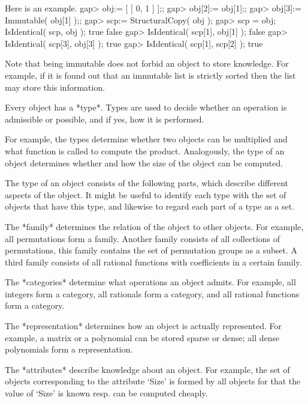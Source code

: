Here is an example.
\beginexample
    gap> obj:= [ [ 0, 1 ] ];;
    gap> obj[2]:= obj[1];;
    gap> obj[3]:= Immutable( obj[1] );;
    gap> scp:= StructuralCopy( obj );
    gap> scp = obj; IsIdentical( scp, obj );
    true
    false
    gap> IsIdentical( scp[1], obj[1] );
    false
    gap> IsIdentical( scp[3], obj[3] );
    true
    gap> IsIdentical( scp[1], scp[2] );
    true
\endexample

Note that being immutable does not forbid an object to store knowledge.
For example, if it is found out that an immutable list is strictly
sorted then the list may store this information.


Every {\GAP} object has a *type*.
Types are used to decide whether an operation is admissible or possible,
and if yes, how it is performed.

For example, the types determine whether two objects can be multiplied
and what function is called to compute the product.
Analogously, the type of an object determines whether and how the size
of the object can be computed.

The type of an object consists of the following parts,
which describe different aspects of the object.
It might be useful to identify each type with the set of objects that
have this type, and likewise to regard each part of a type as a set.

The *family* determines the relation of the object to other objects.
For example, all permutations form a family.
Another family consists of all collections of permutations,
this family contains the set of permutation groups as a subset.
A third family consists of all rational functions with coefficients
in a certain family.

The *categories* determine what operations an object admits.
For example, all integers form a category, all rationals form a category,
and all rational functions form a category.

The *representation* determines how an object is actually represented.
For example, a matrix or a polynomial can be stored sparse or dense;
all dense polynomials form a representation.

The *attributes* describe knowledge about an object.
For example, the set of objects corresponding to the attribute `Size'
is formed by all objects for that the value of `Size' is known resp.
can be computed cheaply.

